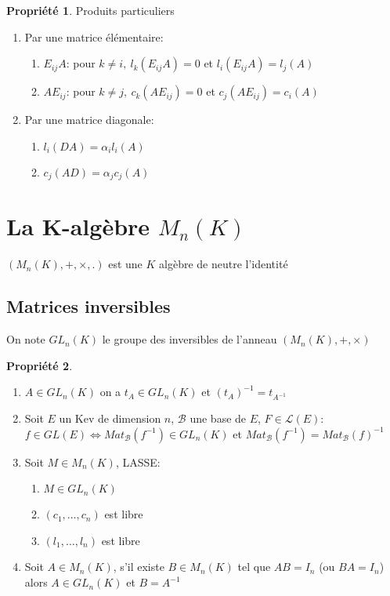 \documentclass[fleqn]{article}
\theoremstyle{definition} \newtheorem*{defi}{D\'efinition}
\theoremstyle{definition} \newtheorem*{theo}{Th\'eor\`eme}
\theoremstyle{definition} \newtheorem*{coro}{Corollaire}
\theoremstyle{definition} \newtheorem*{nota}{Notation}
\theoremstyle{definition} \newtheorem*{vocab}{Vocabulaire}
\theoremstyle{remark} \newtheorem*{rqs}{Remarques}
\theoremstyle{definition} \newtheorem*{prop}{Propri\'et\'e}
\begin{document}
\begin{prop} Produits particuliers
	\begin{enumerate}
		\item Par une matrice \'el\'ementaire:
			\begin{enumerate}
				\item $E_{ij} A$: pour $k \neq i,\ l_k(E_{ij}A) = 0$ et $l_i (E_{ij}A) = l_j(A)$
				\item $A E_{ij}$: pour $k \neq j,\ c_k(A E_{ij}) = 0$ et $c_j(A E_{ij}) = c_i(A)$
			\end{enumerate}
		\item Par une matrice diagonale:
			\begin{enumerate}
				\item $l_i(DA) = \alpha_i l_i(A)$
				\item $c_j(AD) = \alpha_j c_j(A)$
			\end{enumerate}
	\end{enumerate}
\end{prop}

\section{La K-alg\`ebre $M_n(K)$}
$(M_n(K), +, \times, .)$ est une $K$ alg\`ebre de neutre l'identit\'e

\subsection{Matrices inversibles}
On note $GL_n(K)$ le groupe des inversibles de l'anneau $(M_n(K), +, \times)$

\begin{prop} $ $
	\begin{enumerate}
		\item $A \in GL_n(K)$ on a $t_A \in GL_n(K)$ et $(t_A)^{-1} = t_{A^{-1}}$
		\item Soit $E$ un Kev de dimension $n$, $\mathscr{B}$ une base de $E$, $F \in \mathscr{L}(E)$:\\
			$f \in GL(E) \Leftrightarrow Mat_{\mathscr{B}}(f^{-1}) \in GL_n(K)$ et $Mat_{\mathscr{B}}(f^{-1}) = Mat_{\mathscr{B}}(f)^{-1}$
		\item Soit $M \in M_n(K)$, LASSE:
			\begin{enumerate}
				\item $M \in GL_n(K)$
				\item $(c_1, \hdots, c_n)$ est libre
				\item $(l_1, \hdots, l_n)$ est libre
			\end{enumerate}
		\item Soit $A \in M_n(K)$, s'il existe $B \in M_n(K)$ tel que $AB = I_n$ (ou $BA = I_n$) alors $A \in GL_n(K)$ et $B = A^{-1}$
	\end{enumerate}
\end{prop}
\end{document}
